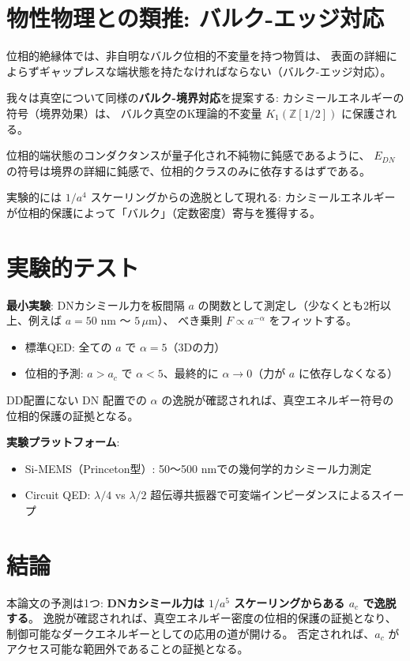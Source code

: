 \documentclass[11pt,a4paper]{article}
\begin{document}
\section{物性物理との類推: バルク-エッジ対応}

位相的絶縁体では、非自明なバルク位相的不変量を持つ物質は、
表面の詳細によらずギャップレスな端状態を持たなければならない（バルク-エッジ対応）。

我々は真空について同様の\textbf{バルク-境界対応}を提案する:
カシミールエネルギーの符号（境界効果）は、
バルク真空のK理論的不変量 $K_1(\mathbb{Z}[1/2])$ に保護される。

位相的端状態のコンダクタンスが量子化され不純物に鈍感であるように、
$E_{DN}$ の符号は境界の詳細に鈍感で、位相的クラスのみに依存するはずである。

実験的には $1/a^4$ スケーリングからの逸脱として現れる:
カシミールエネルギーが位相的保護によって「バルク」（定数密度）寄与を獲得する。

\section{実験的テスト}

\textbf{最小実験}: DNカシミール力を板間隔 $a$ の関数として測定し（少なくとも2桁以上、例えば $a = 50$ nm 〜 $5\,\mu$m）、
べき乗則 $F \propto a^{-\alpha}$ をフィットする。

\begin{itemize}
\item 標準QED: 全ての $a$ で $\alpha = 5$（3Dの力）
\item 位相的予測: $a > a_c$ で $\alpha < 5$、最終的に $\alpha \to 0$（力が $a$ に依存しなくなる）
\end{itemize}

DD配置にない DN 配置での $\alpha$ の逸脱が確認されれば、真空エネルギー符号の位相的保護の証拠となる。

\textbf{実験プラットフォーム}:
\begin{itemize}
\item Si-MEMS（Princeton型）: 50〜500 nmでの幾何学的カシミール力測定
\item Circuit QED: $\lambda/4$ vs $\lambda/2$ 超伝導共振器で可変端インピーダンスによるスイープ
\end{itemize}

\section{結論}

本論文の予測は1つ: \textbf{DNカシミール力は $1/a^5$ スケーリングからある $a_c$ で逸脱する}。
逸脱が確認されれば、真空エネルギー密度の位相的保護の証拠となり、
制御可能なダークエネルギーとしての応用の道が開ける。
否定されれば、$a_c$ がアクセス可能な範囲外であることの証拠となる。
\end{document}
